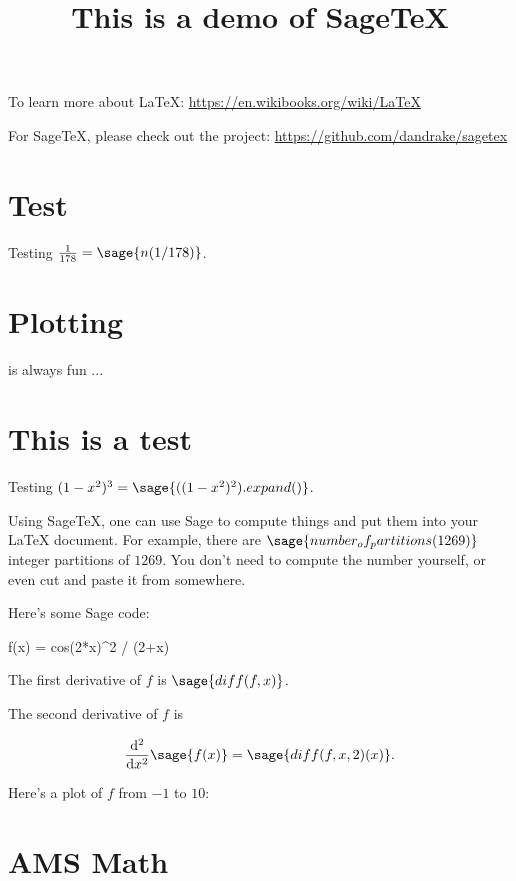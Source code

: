 \documentclass{article}
\title{This is a demo of SageTeX}
\begin{document}
\maketitle

To learn more about \LaTeX: \url{https://en.wikibooks.org/wiki/LaTeX}

For SageTeX, please check out the project:
\url{https://github.com/dandrake/sagetex}

\section{Test}

Testing $\frac{1}{178} = \sage{n(1/178)}$.

\section{Plotting}

is always fun ...


\section{This is a test}

Testing $(1-x^2)^3 = \sage{((1-x^2)^2).expand()}$.

Using Sage\TeX, one can use Sage to compute things and put them into
your \LaTeX{} document. For example, there are
$\sage{number_of_partitions(1269)}$ integer partitions of $1269$.
You don't need to compute the number yourself, or even cut and paste
it from somewhere.

Here's some Sage code:

\begin{sageblock}
f(x) = cos(2*x)^2 / (2+x)
\end{sageblock}

The first derivative of $f$ is $\sage{diff(f,x)}$.

The second derivative of $f$ is

\[
  \frac{\mathrm{d}^{2}}{\mathrm{d}x^{2}} \sage{f(x)} =
  \sage{diff(f, x, 2)(x)}.
\]

Here's a plot of $f$ from $-1$ to $10$:


\section{AMS Math}
\end{document}
